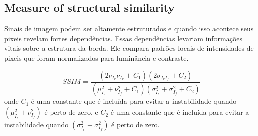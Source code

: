 \documentclass[conference]{IEEEtran}
\begin{document}
\subsection{Measure of structural similarity}
Sinais de imagem podem ser altamente estruturados e quando isso acontece seus pixeis revelam fortes dependências. Essas dependências levariam informações vitais sobre a estrutura da borda. Ele compara padrões locais de intensidades de pixeis que foram normalizados para luminância e contraste.

\begin{equation}
SSIM=\frac{(2\nu_{I_r}\nu_{I_r}+C_1)(2\sigma_{I_rI_f}+C_2)}{(\mu_{I_r}^2+\nu_{I_f}^2+C_1)(\sigma_{I_r}^2+\sigma_{I_f}^2+C_2)}
\end{equation}
onde $C_1$ é uma constante que é incluída para evitar a instabilidade quando $(\mu_{I_r}^2+\nu_{I_f}^2)$ é perto de zero, e $C_2$ é uma constante que é incluída para evitar a instabilidade quando $(\sigma_{I_r}^2+\sigma_{I_f}^2)$ é perto de zero.
\end{document}
